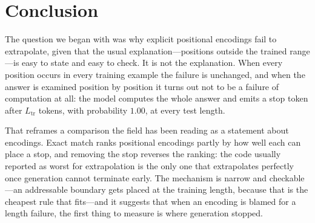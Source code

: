 \section{Conclusion}
\label{sec:conclusion}

The question we began with was why explicit positional encodings fail to
extrapolate, given that the usual explanation---positions outside the trained
range---is easy to state and easy to check. It is not the explanation. When every
position occurs in every training example the failure is unchanged, and when the
answer is examined position by position it turns out not to be a failure of
computation at all: the model computes the whole answer and emits a stop token after
$L_{\mathrm{tr}}$ tokens, with probability $1.00$, at every test length.

That reframes a comparison the field has been reading as a statement about
encodings. Exact match ranks positional encodings partly by how well each can place
a stop, and removing the stop reverses the ranking: the code usually reported as
worst for extrapolation is the only one that extrapolates perfectly once generation
cannot terminate early. The mechanism is narrow and checkable---an addressable
boundary gets placed at the training length, because that is the cheapest rule that
fits---and it suggests that when an encoding is blamed for a length failure, the
first thing to measure is where generation stopped.
